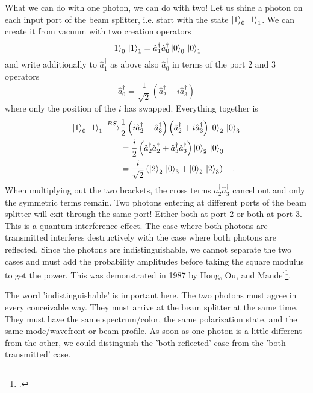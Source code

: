 What we can do with one photon, we can do with two! Let us shine a photon on each input port of the beam splitter, i.e. start with the state $\ket{1}_0 \, \ket{1}_1 $. We can create it from vacuum with two creation operators
\begin{equation}
    \ket{1}_0 \,  \ket{1}_1 = \hat{a}^\dagger_1 \hat{a}^\dagger_0 \ket{0}_0 \,  \ket{0}_1 
\end{equation}
and write additionally to $ \hat{a}^\dagger_1$ as above also  $\hat{a}^\dagger_0$ in terms of the port 2 and 3 operators 
\begin{equation}
    \hat{a}^\dagger_0 = \frac{1}{\sqrt{2}} \left(  \hat{a}^\dagger_2 + i \hat{a}^\dagger_3 \right)
\end{equation}
where only the position of the $i$ has swapped. Everything together is
\begin{align}
    \ket{1}_0 \,  \ket{1}_1  \xrightarrow{BS} & \frac{1}{2} 
    \left( i \hat{a}^\dagger_2 +  \hat{a}^\dagger_3\right) 
     \left( \hat{a}^\dagger_2 + i \hat{a}^\dagger_3\right) 
      \ket{0}_2 \,  \ket{0}_3 \\
      & = \frac{i}{2} 
      \left(  \hat{a}^\dagger_2  \hat{a}^\dagger_2 +  \hat{a}^\dagger_3 \hat{a}^\dagger_3\right) 
        \ket{0}_2 \,  \ket{0}_3 \\
        & = \frac{i}{\sqrt{2}} 
        \left(    \ket{2}_2 \,  \ket{0}_3 +  \ket{0}_2 \,  \ket{2}_3 \right)  \quad .
\end{align}
When multiplying out the two brackets, the cross terms $\hat{a}^\dagger_2  \hat{a}^\dagger_3$ cancel out and only the symmetric terms remain.  Two photons entering at different ports of the beam splitter will exit through the same port! Either both at port 2 or both at port 3. This is a quantum interference effect. The case where both photons are transmitted interferes destructively with the case where both photons are reflected. Since the photons are indistinguishable, we cannot separate the two cases and must add the probability amplitudes before taking the square modulus to get the power. This was demonstrated in 1987 by Hong, Ou, and Mandel\footcite{HOM87}.



The word 'indistinguishable' is important here. The two photons must agree in every conceivable way. They must arrive at the beam splitter at the same time. They must have the same spectrum/color, the same polarization state, and the same mode/wavefront or beam profile. As soon as one photon is a little different from the other, we could distinguish the 'both reflected' case from the 'both transmitted' case.
 
